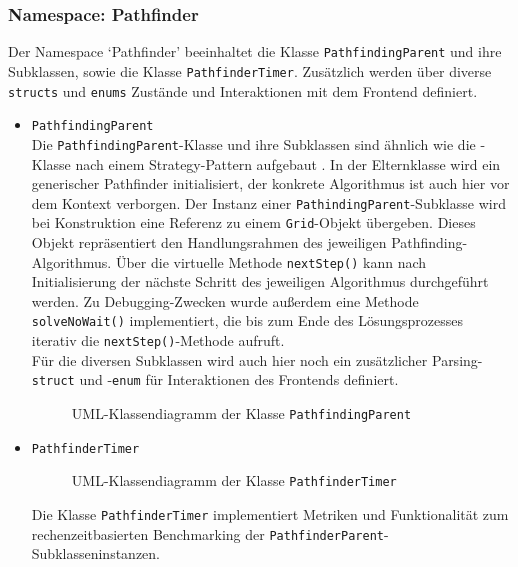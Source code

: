 \subsubsection{Namespace: Pathfinder}
\label{subsubsec:aufbau_backend_ueberblick_pathfinder}
Der Namespace `Pathfinder' beeinhaltet die Klasse \texttt{PathfindingParent} und ihre Subklassen, sowie die Klasse \texttt{PathfinderTimer}.
Zusätzlich werden über diverse \texttt{structs} und \texttt{enums} Zustände und Interaktionen mit dem Frontend definiert.
\begin{itemize}
    \item \texttt{PathfindingParent}\\
    Die \texttt{PathfindingParent}-Klasse und ihre Subklassen sind ähnlich wie die -Klasse nach einem Strategy-Pattern aufgebaut \cite{nesteruk2021}.
    In der Elternklasse wird ein generischer Pathfinder initialisiert, der konkrete Algorithmus ist auch hier vor dem Kontext verborgen.
    Der Instanz einer \texttt{Pathinding\-Parent}-Subklasse wird bei Konstruktion eine Referenz zu einem \texttt{Grid}-Objekt übergeben.
    Dieses Objekt repräsentiert den Handlungsrahmen des jeweiligen Pathfinding-Algorithmus.
    Über die virtuelle Methode \texttt{nextStep()} kann nach Initialisierung der nächste Schritt des jeweiligen Algorithmus durchgeführt werden.
    Zu Debugging-Zwecken wurde außerdem eine Methode \\ \texttt{solveNoWait()} implementiert, die bis zum Ende des Lösungsprozesses
    iterativ die \texttt{nextStep()}-Methode aufruft.\\
    Für die diversen Subklassen wird auch hier noch ein zusätzlicher Parsing-\texttt{struct} und -\texttt{enum} für Interaktionen des Frontends definiert.
    \begin{figure}[H]
              \vspace{-0.5cm}
              \centering
              
              \caption{UML-Klassendiagramm der Klasse \texttt{PathfindingParent}}
              \label{fig:uml_pathfinder}
    \end{figure}
    \item \texttt{PathfinderTimer}\\
    \begin{figure}[H]
        \vspace{-0.5cm}
        \centering
        
        \caption{UML-Klassendiagramm der Klasse \texttt{PathfinderTimer}}
        \label{fig:uml_pathfinder_timer}
    \end{figure}
    Die Klasse \texttt{PathfinderTimer} implementiert Metriken und Funktionalität zum rechenzeitbasierten Benchmarking der \texttt{PathfinderParent}-Subklassen\-instanzen.
\end{itemize}
